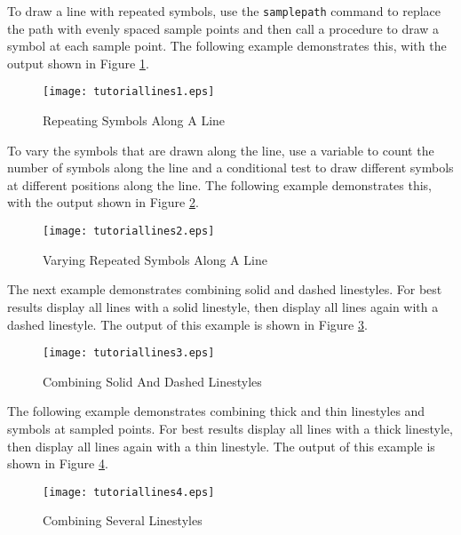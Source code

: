 To draw a line with repeated symbols, use the
\texttt{samplepath}
command to replace the path with evenly spaced sample points and
then call a procedure to draw a symbol at each sample point.
The following example demonstrates this,
with the output shown in Figure \ref{tutoriallines1}.



\begin{figure}[htb]
\texttt{[image: tutoriallines1.eps]}
\caption{Repeating Symbols Along A Line}
\label{tutoriallines1}
\end{figure}

To vary the symbols that are drawn along the line, use a variable
to count the number of symbols along the line and a conditional
test to draw different symbols at different positions along the line.
The following example demonstrates this,
with the output shown in Figure \ref{tutoriallines2}.



\begin{figure}[htb]
\texttt{[image: tutoriallines2.eps]}
\caption{Varying Repeated Symbols Along A Line}
\label{tutoriallines2}
\end{figure}

The next example demonstrates
combining solid and dashed linestyles.
For best results display all lines with a solid linestyle,
then display all lines again with a dashed linestyle.
The output of this example is shown in Figure \ref{tutoriallines3}.



\begin{figure}[htb]
\texttt{[image: tutoriallines3.eps]}
\caption{Combining Solid And Dashed Linestyles}
\label{tutoriallines3}
\end{figure}

The following example demonstrates combining thick and
thin linestyles and symbols at sampled points.
For best results display all lines with a thick linestyle,
then display all lines again with a thin linestyle.
The output of this example is shown in Figure \ref{tutoriallines4}.



\begin{figure}[htb]
\texttt{[image: tutoriallines4.eps]}
\caption{Combining Several Linestyles}
\label{tutoriallines4}
\end{figure}

